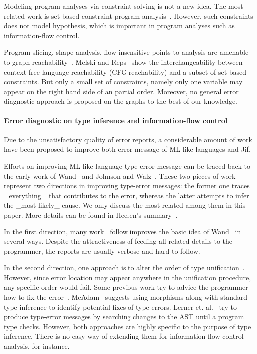 Modeling program analyses via constraint solving is not a new idea. The most
related work is set-based constraint program
analysis~\cite{aiken-setconstraint, aiken-typeinclusion}.  However, such
constraints does not model hypothesis, which is important in program analyses
such as information-flow control.
 
Program slicing, shape analysis, flow-insensitive points-to analysis are
amenable to graph-reachability~\cite{reps-graph}. Melski and
Reps~\cite{melski-cflgraph} show the interchangeability between
context-free-language reachability (CFG-reachability) and a subset of
set-based constraints. But only a small set of constraints, namely
only one variable may appear on the right hand side of an partial
order. Moreover, no general error diagnostic approach is proposed on
the graphs to the best of our knowledge. 

\paragraph{Error diagnostic on type inference and information-flow
control} 

Due to the unsatisfactory quality of error reports, a considerable
amount of work have been proposed to improve both error message of
ML-like languages and Jif.

Efforts on improving ML-like language type-error message can be traced back to
the early work of Wand~\cite{wand-errorfinding} and Johnson and
Walz~\cite{johnson-popl86}. These two pieces of work represent two directions
in improving type-error messages: the former one traces _everything_ that
contributes to the error, whereas the latter attempts to infer the _most
likely_ cause. We only discuss the most related among them in this paper. More
details can be found in Heeren's summary~\cite{heeren:thesis}.

In the first direction, many work~\cite{choppella95, haack:slicing,
tip:slicing} follow improves the basic idea of Wand~\cite{wand-errorfinding} in
several ways. Despite the attractiveness of feeding all related details to the
programmer, the reports are usually verbose and hard to follow.

In the second direction, one approach is to alter the order of type
unification~\cite{lee:toplas, mcadam:unification}. However, since error
location may appear anywhere in the unification procedure, any specific order
would fail. Some previous work try to advice the programmer how to fix the
error~\cite{mcadam:thesis, lerner:pldi07}. McAdam~\cite{mcadam:thesis} suggests
using morphisms along with standard type inference to identify potential fixes
of type errors. Lerner et. al.~\cite{lerner:pldi07} try to produce type-error
messages by searching changes to the AST until a program type checks. However,
both approaches are highly specific to the purpose of type inference. There is
no easy way of extending them for information-flow control analysis, for
instance.


